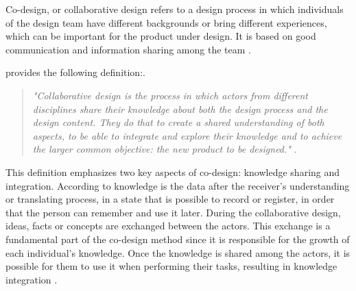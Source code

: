 Co-design, or collaborative design refers to a design process in which individuals of the design team have different backgrounds or bring different experiences, which can be important for the product under design. It is based on good communication and information sharing among the team \cite{chiu2002organizational}.

 provides the following definition:.

\begin{quote}
    \textit{"Collaborative design is the process in which actors from different disciplines share their knowledge about both the design process and the design content. They do that to create a shared understanding of both aspects, to be able to integrate and explore their knowledge and to achieve the larger common objective: the new product to be designed."} \cite{kleinsmann2006understanding}.
\end{quote}

This definition emphasizes two key aspects of co-design: knowledge sharing and integration. According to  knowledge is the data after the receiver’s understanding or translating process, in a state that is possible to record or register, in order that the person can remember and use it later. During the collaborative design, ideas, facts or concepts are exchanged between the actors. This exchange is a fundamental part of the co-design method since it is responsible for the growth of each individual’s knowledge. Once the knowledge is shared among the actors, it is possible for them to use it when performing their tasks, resulting in knowledge integration \cite{kleinsmann2006understanding}.